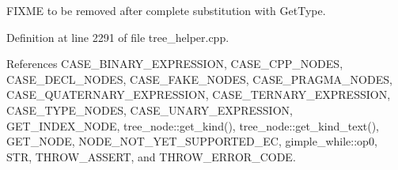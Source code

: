F\+I\+X\+ME to be removed after complete substitution with Get\+Type. 



Definition at line 2291 of file tree\+\_\+helper.\+cpp.



References C\+A\+S\+E\+\_\+\+B\+I\+N\+A\+R\+Y\+\_\+\+E\+X\+P\+R\+E\+S\+S\+I\+ON, C\+A\+S\+E\+\_\+\+C\+P\+P\+\_\+\+N\+O\+D\+ES, C\+A\+S\+E\+\_\+\+D\+E\+C\+L\+\_\+\+N\+O\+D\+ES, C\+A\+S\+E\+\_\+\+F\+A\+K\+E\+\_\+\+N\+O\+D\+ES, C\+A\+S\+E\+\_\+\+P\+R\+A\+G\+M\+A\+\_\+\+N\+O\+D\+ES, C\+A\+S\+E\+\_\+\+Q\+U\+A\+T\+E\+R\+N\+A\+R\+Y\+\_\+\+E\+X\+P\+R\+E\+S\+S\+I\+ON, C\+A\+S\+E\+\_\+\+T\+E\+R\+N\+A\+R\+Y\+\_\+\+E\+X\+P\+R\+E\+S\+S\+I\+ON, C\+A\+S\+E\+\_\+\+T\+Y\+P\+E\+\_\+\+N\+O\+D\+ES, C\+A\+S\+E\+\_\+\+U\+N\+A\+R\+Y\+\_\+\+E\+X\+P\+R\+E\+S\+S\+I\+ON, G\+E\+T\+\_\+\+I\+N\+D\+E\+X\+\_\+\+N\+O\+DE, tree\+\_\+node\+::get\+\_\+kind(), tree\+\_\+node\+::get\+\_\+kind\+\_\+text(), G\+E\+T\+\_\+\+N\+O\+DE, N\+O\+D\+E\+\_\+\+N\+O\+T\+\_\+\+Y\+E\+T\+\_\+\+S\+U\+P\+P\+O\+R\+T\+E\+D\+\_\+\+EC, gimple\+\_\+while\+::op0, S\+TR, T\+H\+R\+O\+W\+\_\+\+A\+S\+S\+E\+RT, and T\+H\+R\+O\+W\+\_\+\+E\+R\+R\+O\+R\+\_\+\+C\+O\+DE.



